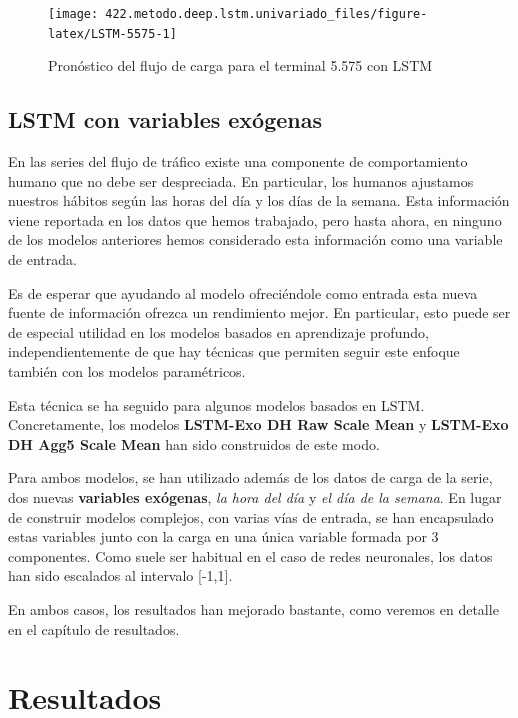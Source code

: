 \documentclass[]{book}
\begin{document}
\begin{figure}[H]

{\centering \texttt{[image: 422.metodo.deep.lstm.univariado\_files/figure-latex/LSTM-5575-1]} 

}

\caption{Pronóstico del flujo de carga para el terminal 5.575 con LSTM}\label{fig:LSTM-5575}
\end{figure}

\section{LSTM con variables exógenas}\label{lstm-con-variables-exogenas}

En las series del flujo de tráfico existe una componente de
comportamiento humano que no debe ser despreciada. En particular, los
humanos ajustamos nuestros hábitos según las horas del día y los días de
la semana. Esta información viene reportada en los datos que hemos
trabajado, pero hasta ahora, en ninguno de los modelos anteriores hemos
considerado esta información como una variable de entrada.

Es de esperar que ayudando al modelo ofreciéndole como entrada esta
nueva fuente de información ofrezca un rendimiento mejor. En particular,
esto puede ser de especial utilidad en los modelos basados en
aprendizaje profundo, independientemente de que hay técnicas que
permiten seguir este enfoque también con los modelos paramétricos.

Esta técnica se ha seguido para algunos modelos basados en LSTM.
Concretamente, los modelos \textbf{LSTM-Exo DH Raw Scale Mean} y
\textbf{LSTM-Exo DH Agg5 Scale Mean} han sido construidos de este modo.

Para ambos modelos, se han utilizado además de los datos de carga de la
serie, dos nuevas \textbf{variables exógenas}, \emph{la hora del día} y
\emph{el día de la semana}. En lugar de construir modelos complejos, con
varias vías de entrada, se han encapsulado estas variables junto con la
carga en una única variable formada por 3 componentes. Como suele ser
habitual en el caso de redes neuronales, los datos han sido escalados al
intervalo {[}-1,1{]}.

En ambos casos, los resultados han mejorado bastante, como veremos en
detalle en el capítulo de resultados.

\chapter{Resultados}\label{resultados}
\end{document}
